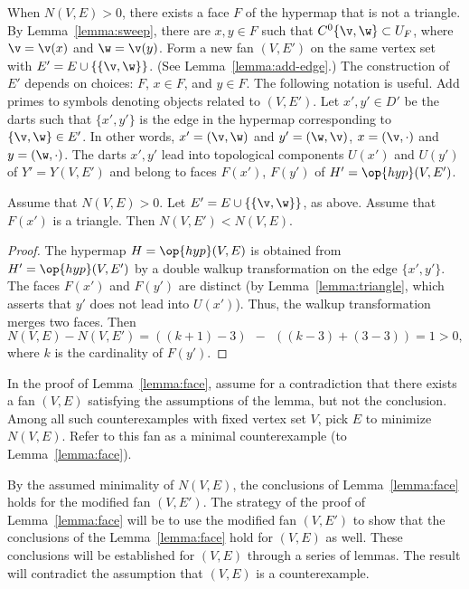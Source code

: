 When $N(V,E)>0$,  there exists a face $F$ of the hypermap that is not a triangle.  By Lemma~\ref{lemma:sweep}, there are $x,y\in F$ such that $C^0\{\v,\w\}\subset U_F$, where $\v = \v(x)$ and $\w = \v(y)$. Form a new fan $(V,E')$ on the same vertex set with
$E' = E\cup \{\{\v,\w\}\}$.   (See Lemma~\ref{lemma:add-edge}.)  The construction of $E'$ depends on choices: $F$, $x\in F$, and $y\in F$.   The following notation is useful.  Add primes to symbols denoting objects related to $(V,E')$.  
Let $x',y'\in D'$ be the darts such that $\{x',y'\}$ is the edge in the hypermap corresponding to $\{\v,\w\}\in E'$.  In other words, $x'=(\v,\w)$ and $y'=(\w,\v)$, $x=(\v,\cdot)$ and $y=(\w,\cdot)$. The darts $x',y'$ lead into topological components $U(x')$ and $U(y')$ of $Y'=Y(V,E')$  and belong to faces $F(x')$, $F(y')$ of $H'=\op{hyp}(V,E')$.

\begin{lemma} 
Assume that $N(V,E)>0$.  Let $E'=E\cup \{\{\v,\w\}\}$, as above.  Assume that $F(x')$  is a triangle. Then $N(V,E')<N(V,E)$.
\end{lemma}


\begin{proof}    The hypermap $H=\op{hyp}(V,E)$ is obtained from $H'=\op{hyp}(V,E')$ by a double walkup transformation on the edge $\{x',y'\}$.    The faces $F(x')$ and $F(y')$ are distinct (by Lemma~\ref{lemma:triangle}, which asserts that $y'$ does not lead into $U(x')$).  Thus, the walkup transformation merges two faces.   Then 
$$N(V,E) - N(V,E') = ((k+1)-3) ~~-~~ ((k-3) + (3-3)) = 1 >0,$$
where $k$ is the cardinality of $F(y')$.
\end{proof}

In the proof of Lemma~\ref{lemma:face},
assume for a contradiction that there exists a fan $(V,E)$ 
satisfying the assumptions of the lemma, but not the conclusion.
Among all such counterexamples with fixed vertex set $V$,  pick
$E$ to minimize  $N(V,E)$.  Refer to this fan as a minimal counterexample (to
Lemma~\ref{lemma:face}).  

By the assumed minimality of $N(V,E)$, the conclusions of Lemma~\ref{lemma:face} holds for the
modified fan $(V,E')$.  The strategy of the proof of Lemma~\ref{lemma:face} will
be to use the modified fan $(V,E')$ to show that the conclusions of the Lemma~\ref{lemma:face} hold for $(V,E)$ as well.   These conclusions will be established for $(V,E)$ through a series of lemmas.  The result will contradict the assumption that
$(V,E)$ is a counterexample.

